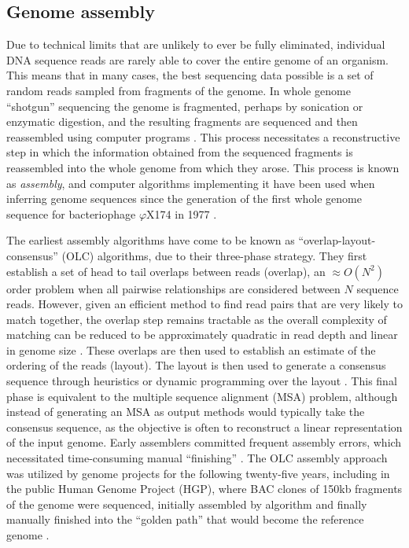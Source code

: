 \documentclass[a4paper,12pt,numbered,oneside]{Classes/PhDThesisPSnPDF}
\begin{document}

\subsection{Genome assembly}
\label{sec:genome_assembly}

Due to technical limits that are unlikely to ever be fully eliminated, individual DNA sequence reads are rarely able to cover the entire genome of an organism.
This means that in many cases, the best sequencing data possible is a set of random reads sampled from fragments of the genome. 
In whole genome ``shotgun'' sequencing the genome is fragmented, perhaps by sonication or enzymatic digestion, and the resulting fragments are sequenced and then reassembled using computer programs \cite{gardner1981complete, sanger1982nucleotide}.
This process necessitates a reconstructive step in which the information obtained from the sequenced fragments is reassembled into the whole genome from which they arose.
This process is known as \emph{assembly}, and computer algorithms implementing it have been used when inferring genome sequences since the generation of the first whole genome sequence for bacteriophage $\varphi$X174 in 1977 \cite{sanger1977nucleotide, staden1979strategy}.

The earliest assembly algorithms have come to be known as ``overlap-layout-consensus'' (OLC) algorithms, due to their three-phase strategy.
They first establish a set of head to tail overlaps between reads (overlap), an $\approx O(N^{2})$ order problem when all pairwise relationships are considered between $N$ sequence reads.
However, given an efficient method to find read pairs that are very likely to match together, the overlap step remains tractable as the overall complexity of matching can be reduced to be approximately quadratic in read depth and linear in genome size \cite{huang1992contig}.
These overlaps are then used to establish an estimate of the ordering of the reads (layout).
The layout is then used to generate a consensus sequence through heuristics or dynamic programming over the layout \cite{kececioglu1995combinatorial}.
This final phase is equivalent to the multiple sequence alignment (MSA) problem, although instead of generating an MSA as output methods would typically take the consensus sequence, as the objective is often to reconstruct a linear representation of the input genome.
Early assemblers committed frequent assembly errors, which necessitated time-consuming manual ``finishing'' \cite{gordon1998consed}.
The OLC assembly approach was utilized by genome projects for the following twenty-five years, including in the public Human Genome Project (HGP), where BAC clones of 150kb fragments of the genome were sequenced, initially assembled by algorithm and finally manually finished into the ``golden path'' that would become the reference genome \cite{international2001initial}.
\end{document}
